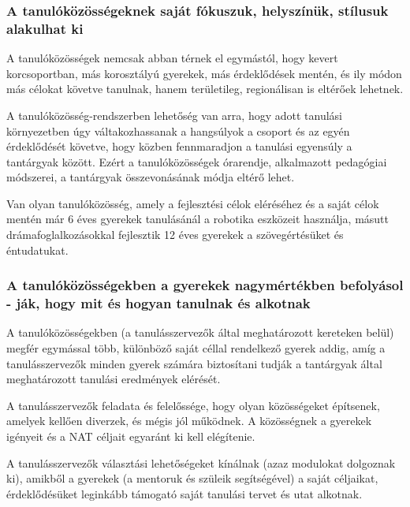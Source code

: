 \hypertarget{a-tanulokozossegeknek-sajat-fokuszuk-helyszinuk-stilusuk-alakulhat-ki}{%
\subsubsection{A tanulóközösségeknek saját fókuszuk, helyszínük,
stílusuk alakulhat
ki}\label{a-tanulokozossegeknek-sajat-fokuszuk-helyszinuk-stilusuk-alakulhat-ki}}

A tanulóközösségek nemcsak abban térnek el egymástól, hogy kevert
korcsoportban, más korosztályú gyerekek, más érdeklődések mentén, és ily
módon más célokat követve tanulnak, hanem területileg, regionálisan is
eltérőek lehetnek.

A tanulóközösség-rendszerben lehetőség van arra, hogy adott tanulási
környezetben úgy váltakozhassanak a hangsúlyok a csoport és az egyén
érdeklődését követve, hogy közben fennmaradjon a tanulási egyensúly a
tantárgyak között. Ezért a tanulóközösségek órarendje, alkalmazott
pedagógiai módszerei, a tantárgyak összevonásának módja eltérő lehet.

Van olyan tanulóközösség, amely a fejlesztési célok eléréséhez és a
saját célok mentén már 6 éves gyerekek tanulásánál a robotika eszközeit
használja, másutt drámafoglalkozásokkal fejlesztik 12 éves gyerekek a
szövegértésüket és éntudatukat.

\hypertarget{a-tanulokozossegekben-a-gyerekek-nagymertekben-befolyasoljak-hogy-mit-es-hogyan-tanulnak-es-alkotnak}{%
\subsubsection{A tanulóközösségekben a gyerekek nagymértékben
befolyásol\\-
ják, hogy mit és hogyan tanulnak és
alkotnak}\label{a-tanulokozossegekben-a-gyerekek-nagymertekben-befolyasoljak-hogy-mit-es-hogyan-tanulnak-es-alkotnak}}

A tanulóközösségekben (a tanulásszervezők által meghatározott kereteken
belül) megfér egymással több, különböző saját céllal rendelkező gyerek
addig, amíg a tanulásszervezők minden gyerek számára biztosítani tudják
a tantárgyak által meghatározott tanulási eredmények elérését.

A tanulásszervezők feladata és felelőssége, hogy olyan közösségeket
építsenek, amelyek kellően diverzek, és mégis jól működnek. A
közösségnek a gyerekek igényeit és a NAT céljait egyaránt ki kell
elégítenie.

A tanulásszervezők választási lehetőségeket kínálnak (azaz modulokat
dolgoznak ki), amikből a gyerekek (a mentoruk és szüleik segítségével) a
saját céljaikat, érdeklődésüket leginkább támogató saját tanulási tervet
és utat alkotnak.

